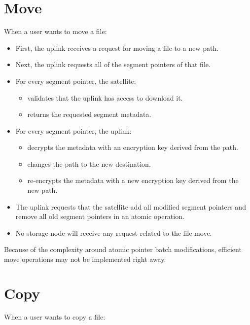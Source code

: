 \documentclass[11pt,fleqn,openany]{book}
\begin{document}
\section{Move}

When a user wants to move a file:

\begin{itemize}
\item First, the uplink receives a request for moving a file to a new path.
\item Next, the uplink requests all of the segment pointers of that file.
\item For every segment pointer, the satellite:
  \begin{itemize}
  \item validates that the uplink has access to download it.
  \item returns the requested segment metadata.
  \end{itemize}
\item For every segment pointer, the uplink:
  \begin{itemize}
  \item decrypts the metadata with an encryption key derived from the path.
  \item changes the path to the new destination.
  \item re-encrypts the metadata with a new encryption key derived from the
    new path.
  \end{itemize}
\item The uplink requests that the satellite add
  all modified segment pointers and remove all old segment pointers in an
  atomic operation.
\item No storage node will receive any request related to the file move.
\end{itemize}

Because of the complexity around atomic pointer batch modifications, efficient
move operations may not be implemented right away.

\section{Copy}

When a user wants to copy a file:
\end{document}
